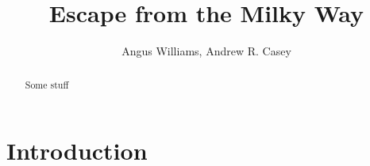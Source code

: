 \documentclass[preprint]{aastex}
\begin{document}
\title{Escape from the Milky Way}

\author{Angus Williams, Andrew R. Casey}


\begin{abstract}
  Some stuff
\end{abstract}


\keywords{
}


\section{Introduction} 
\label{sec:introduction}
\end{document}
